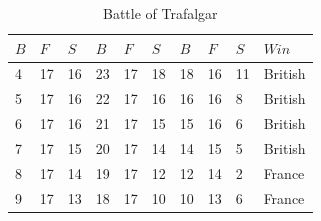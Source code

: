 \documentclass[]{article}
\begin{document}
\begin{table}
\centering
 \tiny
\caption{Battle of Trafalgar\\}
\vspace{0.1cm}
\tiny

{\begin{tabular}{|p{.3cm}|p{.3cm}|p{.3cm}|p{.3cm}|p{.3cm}|p{.3cm}|p{.3cm}|p{.3cm}|p{.3cm}|p{.5cm}|} 
\hline
\centering

$B$ & $F$ & $S$	& $B$	& $F$ & $S$	& $B$ & $F$	& $S$ &$Win$ \\
\hline  	

4&	17&	16	&23	&17&	18&	18	&16&	11& British\\
5&	17&	16	&22	&17&	16&	16	&16&	8& British\\
6&	17&	16	&21	&17&	15&	15	&16&	6& British\\
7&	17&	15	&20	&17&	14&	14	&15&	5& British\\
8&	17&	14	&19	&17&	12&	12	&14&	2& France\\
9&	17&	13	&18	&17&	10&	10	&13&	6& France\\

\hline

\end{tabular}}%
\tiny
\end{table}
\end{document}
